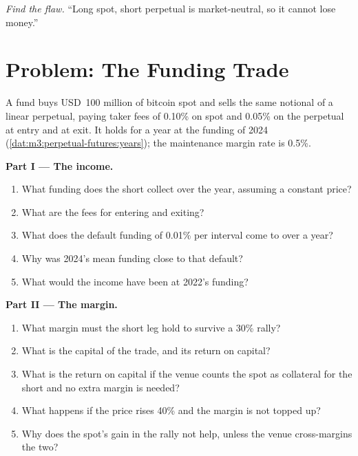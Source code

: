 \begin{exercise}[$\star\star\star$]\label{exo:m3:perpetual-futures:8}
\emph{Find the flaw.} ``Long spot, short perpetual is market-neutral, so it cannot lose money.''
\end{exercise}

\section{Problem: The Funding Trade}

\begin{problem}\label{pb:m3:perpetual-futures:1}
A fund buys USD~100 million of bitcoin spot and sells the same notional of a linear perpetual, paying taker fees of
0.10\% on spot and 0.05\% on the perpetual at entry and at exit. It holds for a year at the funding of 2024
(\cref{dat:m3:perpetual-futures:years}); the maintenance margin rate is 0.5\%.

\medskip\noindent\textbf{Part I --- The income.}
\begin{enumerate}
\item What funding does the short collect over the year, assuming a constant price?
\item What are the fees for entering and exiting?
\item What does the default funding of 0.01\% per interval come to over a year?
\item Why was 2024's mean funding close to that default?
\item What would the income have been at 2022's funding?
\end{enumerate}

\medskip\noindent\textbf{Part II --- The margin.}
\begin{enumerate}[resume]
\item What margin must the short leg hold to survive a 30\% rally?
\item What is the capital of the trade, and its return on capital?
\item What is the return on capital if the venue counts the spot as collateral for the short and no extra margin is
needed?
\item What happens if the price rises 40\% and the margin is not topped up?
\item Why does the spot's gain in the rally not help, unless the venue cross-margins the two?
\end{enumerate}


\end{problem}
